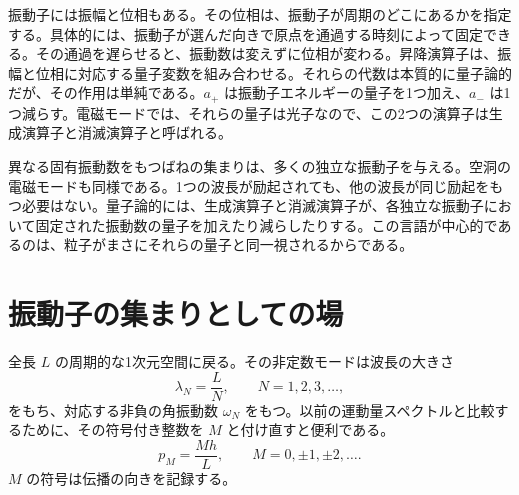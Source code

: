 振動子には振幅と位相もある。その位相は、振動子が周期のどこにあるかを指定する。具体的には、振動子が選んだ向きで原点を通過する時刻によって固定できる。その通過を遅らせると、振動数は変えずに位相が変わる。昇降演算子は、振幅と位相に対応する量子変数を組み合わせる。それらの代数は本質的に量子論的だが、その作用は単純である。\(a_+\) は振動子エネルギーの量子を1つ加え、\(a_-\) は1つ減らす。電磁モードでは、それらの量子は光子なので、この2つの演算子は生成演算子と消滅演算子と呼ばれる。

\begin{classroomqa}
\end{classroomqa}

異なる固有振動数をもつばねの集まりは、多くの独立な振動子を与える。空洞の電磁モードも同様である。1つの波長が励起されても、他の波長が同じ励起をもつ必要はない。量子論的には、生成演算子と消滅演算子が、各独立な振動子において固定された振動数の量子を加えたり減らしたりする。この言語が中心的であるのは、粒子がまさにそれらの量子と同一視されるからである。

\section{振動子の集まりとしての場}

全長 \(L\) の周期的な1次元空間に戻る。その非定数モードは波長の大きさ
\begin{equation}
\lambda_N=\frac{L}{N},
\qquad N=1,2,3,\ldots ,
\end{equation}
をもち、対応する非負の角振動数 \(\omega_N\) をもつ。以前の運動量スペクトルと比較するために、その符号付き整数を \(M\) と付け直すと便利である。
\begin{equation}
p_M=\frac{Mh}{L},
\qquad M=0,\pm1,\pm2,\ldots .
\end{equation}
\(M\) の符号は伝播の向きを記録する。

